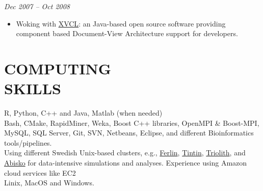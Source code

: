 \documentclass[margin, 10pt]{res} %
\begin{document}
\begin{resume}

 
{\sl \textbf{}} \hfill \textit{Dec 2007 -- Oct 2008} \\
{\color{RubineRed}{Computer Science Department, LUMS, Pakistan}} 
\begin{itemize} 
\item Woking with \href{http://www.sciencedirect.com/science/article/pii/S0167642304000978}{XVCL}: an Java-based open source software providing component based Document-View Architecture support for developers. 
\end{itemize} 



\section{COMPUTING \\ SKILLS} 

{\bf \color{Brown}{Languages:}} 
R, Python, C++ and Java, Matlab (when needed)\\
{\bf \color{Brown}{Misc Tools:}} Bash, CMake, RapidMiner, Weka, Boost C++ libraries, OpenMPI \& Boost-MPI, MySQL, SQL Server, Git, SVN, Netbeans, Eclipse, and different Bioinformatics tools/pipelines. \\
{\bf \color{Brown}{HPC Clusters:}} Using different Swedish Unix-based clusters, e.g., \href{https://www.pdc.kth.se/resources/computers/historical-computers/ferlin}{Ferlin}, \href{http://www.uppmax.uu.se/}{Tintin}, \href{https://www.nsc.liu.se/systems/triolith/}{Triolith}, and \href{http://www.hpc2n.umu.se/resources/abisko}{Abisko} for data-intensive simulations and analyses. Experience using Amazon cloud services like EC2 \\
{\bf \color{Brown}{Operating Systems:}} Linix, MacOS and Windows.


\end{resume}
\end{document}
